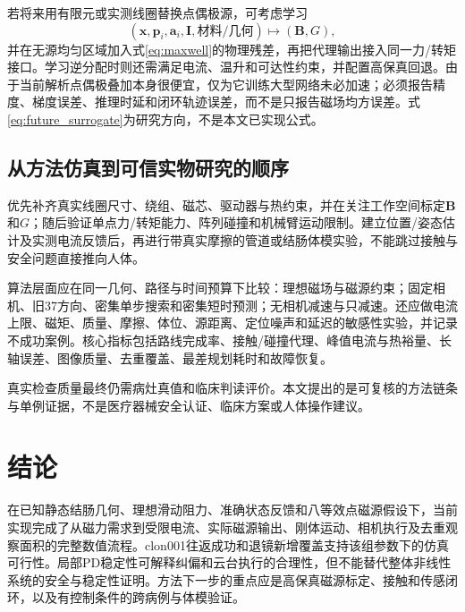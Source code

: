 \documentclass[UTF8,a4paper,zihao=5,fontset=windows]{ctexart}
\newcommand{\vect}[1]{\bm{#1}}
\begin{document}
若将来用有限元或实测线圈替换点偶极源，可考虑学习
\begin{equation}
(\vect x,\vect p_i,\vect a_i,\vect I,\text{材料/几何})\longmapsto(\vect B,G),
\label{eq:future_surrogate}
\end{equation}
并在无源均匀区域加入式\eqref{eq:maxwell}的物理残差，再把代理输出接入同一力/转矩接口。学习逆分配时则还需满足电流、温升和可达性约束，并配置高保真回退。由于当前解析点偶极叠加本身很便宜，仅为它训练大型网络未必加速；必须报告精度、梯度误差、推理时延和闭环轨迹误差，而不是只报告磁场均方误差。式\eqref{eq:future_surrogate}为研究方向，不是本文已实现公式。

\subsection{从方法仿真到可信实物研究的顺序}
优先补齐真实线圈尺寸、绕组、磁芯、驱动器与热约束，并在关注工作空间标定$\vect B$和$G$；随后验证单点力/转矩能力、阵列碰撞和机械臂运动限制。建立位置/姿态估计及实测电流反馈后，再进行带真实摩擦的管道或结肠体模实验，不能跳过接触与安全问题直接推向人体。

算法层面应在同一几何、路径与时间预算下比较：理想磁场与磁源约束；固定相机、旧37方向、密集单步搜索和密集短时预测；无相机减速与只减速。还应做电流上限、磁矩、质量、摩擦、体位、源距离、定位噪声和延迟的敏感性实验，并记录不成功案例。核心指标包括路线完成率、接触/碰撞代理、峰值电流与热裕量、长轴误差、图像质量、去重覆盖、最差规划耗时和故障恢复。

真实检查质量最终仍需病灶真值和临床判读评价。本文提出的是可复核的方法链条与单例证据，不是医疗器械安全认证、临床方案或人体操作建议。

\section{结论}
在已知静态结肠几何、理想滑动阻力、准确状态反馈和八等效点磁源假设下，当前实现完成了从磁力需求到受限电流、实际磁源输出、刚体运动、相机执行及去重观察面积的完整数值流程。clon001往返成功和退镜新增覆盖支持该组参数下的仿真可行性。局部PD稳定性可解释纠偏和云台执行的合理性，但不能替代整体非线性系统的安全与稳定性证明。方法下一步的重点应是高保真磁源标定、接触和传感闭环，以及有控制条件的跨病例与体模验证。
\clearpage\appendix
\end{document}
